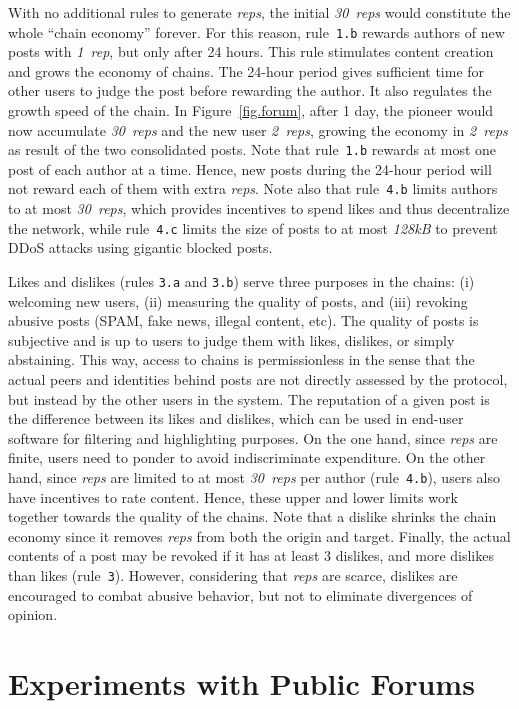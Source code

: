 \documentclass[12pt]{article}
\newcommand{\reps}     {\emph{reps}\xspace}
\newcommand{\onerep}   {\emph{1~rep}\xspace}
\newcommand{\nreps}[1] {\emph{#1~reps\xspace}}
\newcommand{\code}[1]  {\texttt{\footnotesize{#1}}}
\begin{document}
With no additional rules to generate \reps, the initial \nreps{30} would
constitute the whole ``chain economy'' forever.
For this reason, rule~\code{1.b} rewards authors of new posts with \onerep,
but only after 24 hours.
This rule stimulates content creation and grows the economy of chains.
The 24-hour period gives sufficient time for other users to judge the post
before rewarding the author.
It also regulates the growth speed of the chain.
In Figure~\ref{fig.forum}, after 1 day, the pioneer would now accumulate
\nreps{30} and the new user \nreps{2}, growing the economy in \nreps{2} as
result of the two consolidated posts.
Note that rule~\code{1.b} rewards at most one post of each author at a time.
Hence, new posts during the 24-hour period will not reward each of them with
extra \reps.
Note also that rule~\code{4.b} limits authors to at most \nreps{30}, which
provides incentives to spend likes and thus decentralize the network, while
rule~\code{4.c} limits the size of posts to at most \emph{128kB} to prevent
DDoS attacks using gigantic blocked posts.

Likes and dislikes (rules \code{3.a} and \code{3.b}) serve three purposes
in the chains:
    (i) welcoming new users,
    (ii) measuring the quality of posts, and
    (iii) revoking abusive posts (SPAM, fake news, illegal content, etc).
%
The quality of posts is subjective and is up to users to judge them with likes,
dislikes, or simply abstaining.
%
This way, access to chains is permissionless in the sense that the actual peers
and identities behind posts are not directly assessed by the protocol, but
instead by the other users in the system.
%
The reputation of a given post is the difference between its likes and
dislikes, which can be used in end-user software for filtering and highlighting
purposes.
%
On the one hand, since \reps are finite, users need to ponder to avoid
indiscriminate expenditure.
On the other hand, since \reps are limited to at most \nreps{30} per author
(rule~\code{4.b}), users also have incentives to rate content.
Hence, these upper and lower limits work together towards the quality of the
chains.
%
Note that a dislike shrinks the chain economy since it removes \reps from both
the origin and target.
Finally, the actual contents of a post may be revoked if it has at least 3
dislikes, and more dislikes than likes (rule~\code{3}).
However, considering that \reps are scarce, dislikes are encouraged to combat
abusive behavior, but not to eliminate divergences of opinion.

\section{Experiments with Public Forums}
\label{sec.evaluation}
\end{document}
